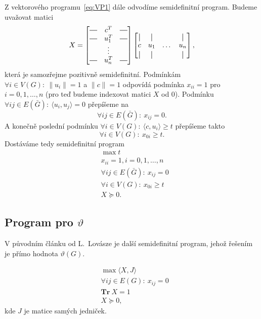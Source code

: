 Z vektorového programu~\ref{eq:VP1} dále odvodíme semidefinitní program. Budeme uvažovat matici
$$
    X =
    \begin{bmatrix}
        \horzbar & c^T    & \horzbar \\
        \horzbar & u_1^T  & \horzbar \\
                 & \vdots &          \\
        \horzbar & u_n^T  & \horzbar
    \end{bmatrix}
    \begin{bmatrix}
        \vertbar & \vertbar &       & \vertbar \\
        c        & u_1      & \dots & u_n      \\
        \vertbar & \vertbar &       & \vertbar \\
    \end{bmatrix},
$$
která je samozřejme pozitivně semidefinitní.
Podmínkám $\forall i \in V(G):\ \| u_i \| = 1$ a $\|c\|=1$ odpovídá podmínka $x_{ii} = 1$ pro $i = 0, 1, \dots, n$ (pro teď budeme indexovat matici $X$ od $0$). Podmínku $\forall ij \in E(\bar{G}):\ \langle u_i, u_j \rangle = 0$ přepíšeme na
$$
    \forall ij \in E(\bar{G}):\ x_{ij} = 0.
$$
A konečně poslední podmínku $\forall i \in V(G):\ \langle c, u_i \rangle \geq t$ přepíšeme takto
$$
    \forall i \in V(G):\ x_{0i} \geq t.
$$
Dostáváme tedy semidefinitní program
\begin{equation}\tag{SDP1}
    \begin{split}
        &\max t \\
        &x_{ii} = 1, i = 0, 1, \dots, n \\
        &\forall ij \in E(\bar{G}):\ x_{ij} = 0 \\
        &\forall i \in V(G):\ x_{0i}  \geq t \\
        &X \succeq 0.
    \end{split}
    \label{eq:SDP1}
\end{equation}


\subsection*{Program pro $\vartheta$}

V původním článku od L.~Lovásze \cite{lovasz} je další semidefinitní program, jehož řešením je přímo hodnota $\vartheta(G)$.

\begin{equation}\tag{SDP2}
    \begin{split}
        &\max \langle X, J \rangle \\
        &\forall ij \in E(G):\ x_{ij} = 0 \\
        &\textbf{Tr}\ X = 1 \\
        &X \succeq 0,
    \end{split}
    \label{eq:SDP2}
\end{equation}
kde $J$ je matice samých jedniček.

